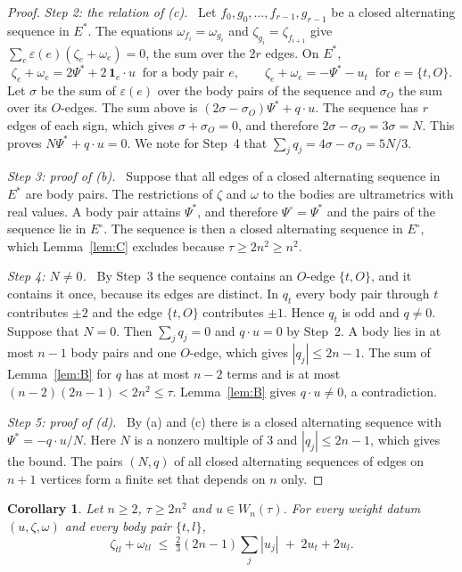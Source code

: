 \documentclass[11pt]{amsart}
\newtheorem{corollary}[theorem]{Corollary}
\theoremstyle{definition}
\theoremstyle{remark}
\numberwithin{equation}{section}
\newcommand{\Ps}{\Psi^{*}}
\newcommand{\Es}{E^{*}}
\newcommand{\Po}{\Psi^{\circ}}
\newcommand{\Eo}{E^{\circ}}
\newcommand{\one}[1]{\mathbf{1}_{#1}}
\newcommand{\step}[1]{\smallskip\noindent\textit{#1}\ }
\begin{document}
\begin{proof}
\step{Step 2: the relation of (c).} Let $f_0, g_0, \dots, f_{r-1}, g_{r-1}$ be a closed alternating
sequence in $\Es$. The equations $\omega_{f_i} = \omega_{g_i}$ and $\zeta_{g_i} = \zeta_{f_{i+1}}$ give
$\sum_e \varepsilon(e) (\zeta_e + \omega_e) = 0$, the sum over the $2r$ edges. On $\Es$,
\[
  \zeta_e + \omega_e = 2\Ps + 2\, \one{e} \cdot u \ \text{ for a body pair } e,
  \qquad
  \zeta_e + \omega_e = -\Ps - u_t \ \text{ for } e = \{t, O\} .
\]
Let $\sigma$ be the sum of $\varepsilon(e)$ over the body pairs of the sequence and $\sigma_O$ the sum
over its $O$-edges. The sum above is $(2\sigma - \sigma_O) \Ps + q \cdot u$. The sequence has $r$ edges
of each sign, which gives $\sigma + \sigma_O = 0$, and therefore $2\sigma - \sigma_O = 3\sigma = N$.
This proves $N \Ps + q \cdot u = 0$. We note for Step~4 that $\sum_j q_j = 4\sigma - \sigma_O = 5N/3$.

\step{Step 3: proof of (b).} Suppose that all edges of a closed alternating sequence in $\Es$ are body
pairs. The restrictions of $\zeta$ and $\omega$ to the bodies are ultrametrics with real values. A body
pair attains $\Ps$, and therefore $\Po = \Ps$ and the pairs of the sequence lie in $\Eo$. The sequence
is then a closed alternating sequence in $\Eo$, which Lemma~\ref{lem:C} excludes because
$\tau \ge 2n^2 \ge n^2$.

\step{Step 4: $N \ne 0$.} By Step~3 the sequence contains an $O$-edge $\{t, O\}$, and it contains it
once, because its edges are distinct. In $q_t$ every body pair through $t$ contributes $\pm 2$ and the
edge $\{t, O\}$ contributes $\pm 1$. Hence $q_t$ is odd and $q \ne 0$. Suppose that $N = 0$. Then
$\sum_j q_j = 0$ and $q \cdot u = 0$ by Step~2. A body lies in at most $n - 1$ body pairs and one
$O$-edge, which gives $|q_j| \le 2n - 1$. The sum of Lemma~\ref{lem:B} for $q$ has at most $n - 2$ terms
and is at most $(n - 2)(2n - 1) < 2n^2 \le \tau$. Lemma~\ref{lem:B} gives $q \cdot u \ne 0$, a
contradiction.

\step{Step 5: proof of (d).} By (a) and (c) there is a closed alternating sequence with
$\Ps = -q \cdot u / N$. Here $N$ is a nonzero multiple of $3$ and $|q_j| \le 2n - 1$, which gives the
bound. The pairs $(N, q)$ of all closed alternating sequences of edges on $n + 1$ vertices form a finite
set that depends on $n$ only.
\end{proof}

\begin{corollary}\label{cor:bound}
Let $n \ge 2$, $\tau \ge 2n^2$ and $u \in W_n(\tau)$. For every weight datum $(u, \zeta, \omega)$ and
every body pair $\{t, l\}$,
\[
  \zeta_{tl} + \omega_{tl} \;\le\; \tfrac23 (2n - 1) \sum_j |u_j| \;+\; 2u_t + 2u_l .
\]
\end{corollary}
\end{document}
